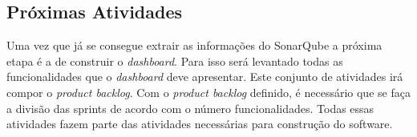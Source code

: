 \subsection{Próximas Atividades}
\label{futuro}
Uma vez que já se consegue extrair as informações do SonarQube a próxima etapa é a de construir o \textit{dashboard}. Para isso será levantado todas as funcionalidades que o \textit{dashboard} deve apresentar. Este conjunto de atividades irá compor o \textit{product backlog}. Com o \textit{product backlog} definido, é necessário que se faça a divisão das sprints de acordo com o número funcionalidades. Todas essas atividades fazem parte das atividades necessárias para construção do software.
